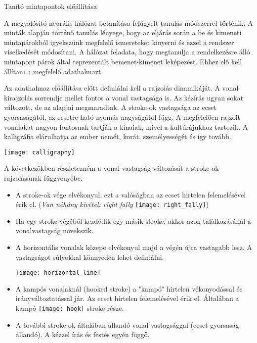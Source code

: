 
Tanító mintapontok előállítása

A megvalósító neurális hálózat betanítása felügyelt tanulás módszerrel történik. A minták alapján történő tanulás lényege, hogy az eljárás során a be és kimeneti mintapárokból igyekszünk megfelelő ismereteket kinyerni és ezzel a rendszer viselkedését módosítani. A hálózat feladata, hogy megtanulja a rendelkezésre álló mintapont párok által reprezentált bemenet-kimenet leképezést. Ehhez elő kell állítani a megfelelő adathalmazt.

Az adathalmaz előállítása elött definiálni kell a rajzolás dinamikáját. A vonal kirajzolás sorrendje mellet fontos a vonal vastagsága is. Az kézírás ugyan sokat változott, de az alapjai megmaradtak. A stroke-ok vastagsága az ecset gyorsaságától, az ecsetre ható nyomás nagyságától függ. A megfelelően rajzolt vonalakat nagyon fontosnak tartják a kínaiak, mivel a kultúrájukhoz tartozik. A kalligráfia elárulhatja az ember nemét, korát, személyességét és így tovább.

\begin{center}
\texttt{[image: calligraphy]}
\end{center}

A következőkben részletezném a vonal vastagság változását a stroke-ok rajzolásának függvényébe. 

\begin{itemize}
\item A stroke-ok vége elvékonyul, ezt a valóságban az ecset hirtelen felemelésével érik el. (\textit{Van néhány kivétel: right fally} \texttt{[image: right\_fally]}) 
\item Ha egy stroke végéből kezdődik egy másik stroke, akkor azok találkozásánál a vonalvastagság növekszik.
\item A horizontális vonalak közepe elvékonyul majd a végén újra vastagabb lesz. A vastagságot súlyokkal könnyedén lehet definiálni.

\begin{center}
\texttt{[image: horizontal\_line]}
\end{center}

\item A kampós vonalaknál (hooked stroke) a "kampó" hirtelen vékonyodással és irányváltoztatással jár. Az ecset hirtelen felemelésével érik el. Általában a kampó \texttt{[image: hook]} stroke része.
\item A további stroke-ok általában állandó vonal vastagsággal (ecset gyorsaság állandó). A kézzel írás és festés egyén függő.
\end{itemize}

